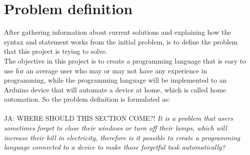 \section{Problem definition}
 After gathering information about current solutions and explaining how the syntax and statement works from the initial problem, is to define the problem that this project is trying to solve. \\ The objective in this project is to create a programming language that is easy to use for an average user who may or may not have any experience in programming, while the programming language will be implemented to an Arduino device that will automate a device at home, which is called home automation. So the problem definition is formulated as:\\
\\

JA: WHERE SHOULD THIS SECTION COME?!
\textit{It is a problem that users sometimes forget to close their windows or turn off their lamps, which will increase their bill in electricity, therefore is it possible to create a programming language connected to a device to make those forgetful task automatically?}


